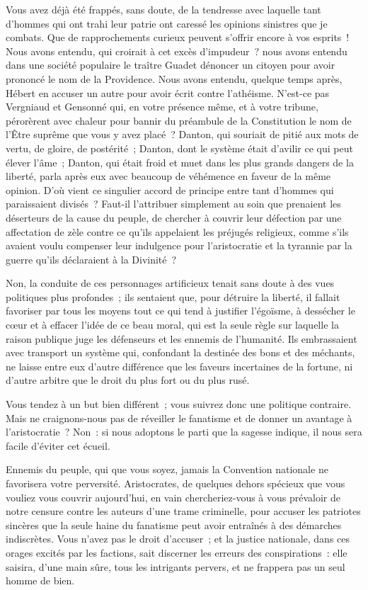 \documentclass[french,twoside]{book} %
\begin{document}
Vous avez déjà été frappés, sans doute, de la tendresse avec laquelle tant d’hommes qui ont trahi leur patrie ont caressé les opinions sinistres que je combats. Que de rapprochements curieux peuvent s’offrir encore à vos esprits ! Nous avons entendu, qui croirait à cet excès d’impudeur ? nous avons entendu dans une société populaire le traître Guadet dénoncer un citoyen pour avoir prononcé le nom de la Providence. Nous avons entendu, quelque temps après, Hébert en accuser un autre pour avoir écrit contre l’athéisme. N’est-ce pas Vergniaud et Gensonné qui, en votre présence même, et à votre tribune, pérorèrent avec chaleur pour bannir du préambule de la Constitution le nom de l’Être suprême que vous y avez placé ? Danton, qui souriait de pitié aux mots de vertu, de gloire, de postérité ; Danton, dont le système était d’avilir ce qui peut élever l’âme ; Danton, qui était froid et muet dans les plus grands dangers de la liberté, parla après eux avec beaucoup de véhémence en faveur de la même opinion. D’où vient ce singulier accord de principe entre tant d’hommes qui paraissaient divisés ? Faut-il l’attribuer simplement au soin que prenaient les déserteurs de la cause du peuple, de chercher à couvrir leur défection par une affectation de zèle contre ce qu’ils appelaient les préjugés religieux, comme s’ils avaient voulu compenser leur indulgence pour l’aristocratie et la tyrannie par la guerre qu’ils déclaraient à la Divinité ?\par
Non, la conduite de ces personnages artificieux tenait sans doute à des vues politiques plus profondes ; ils sentaient que, pour détruire la liberté, il fallait favoriser par tous les moyens tout ce qui tend à justifier l’égoïsme, à dessécher le cœur et à effacer l’idée de ce beau moral, qui est la seule règle sur laquelle la raison publique juge les défenseurs et les ennemis de l’humanité. Ils embrassaient avec transport un système qui, confondant la destinée des bons et des méchants, ne laisse entre eux d’autre différence que les faveurs incertaines de la fortune, ni d’autre arbitre que le droit du plus fort ou du plus rusé.\par
Vous tendez à un but bien différent ; vous suivrez donc une politique contraire. Mais ne craignons-nous pas de réveiller le fanatisme et de donner un avantage à l’aristocratie ? Non : si nous adoptons le parti que la sagesse indique, il nous sera facile d’éviter cet écueil.\par
Ennemis du peuple, qui que vous soyez, jamais la Convention nationale ne favorisera votre perversité. Aristocrates, de quelques dehors spécieux que vous vouliez vous couvrir aujourd’hui, en vain chercheriez-vous à vous prévaloir de notre censure contre les auteurs d’une trame criminelle, pour accuser les patriotes sincères que la seule haine du fanatisme peut avoir entraînés à des démarches indiscrètes. Vous n’avez pas le droit d’accuser ; et la justice nationale, dans ces orages excités par les factions, sait discerner les erreurs des conspirations : elle saisira, d’une main sûre, tous les intrigants pervers, et ne frappera pas un seul homme de bien.\par
\end{document}
